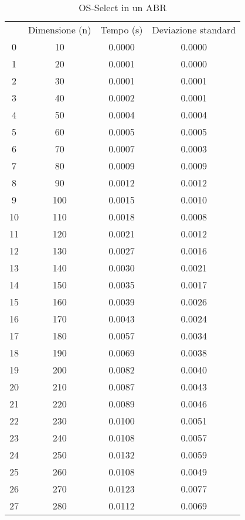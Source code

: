 \begin{table}
\centering
\caption{OS-Select in un ABR}
\label{OS-Select in un ABR}
\begin{adjustbox}{width=1\textwidth/2}
\begin{tabular}{|c|c|c|c|}
\hline
 & Dimensione (n) & Tempo (s) & Deviazione standard \\
0 & 10 & 0.0000 & 0.0000 \\
\cline{1-4}
1 & 20 & 0.0001 & 0.0000 \\
\cline{1-4}
2 & 30 & 0.0001 & 0.0001 \\
\cline{1-4}
3 & 40 & 0.0002 & 0.0001 \\
\cline{1-4}
4 & 50 & 0.0004 & 0.0004 \\
\cline{1-4}
5 & 60 & 0.0005 & 0.0005 \\
\cline{1-4}
6 & 70 & 0.0007 & 0.0003 \\
\cline{1-4}
7 & 80 & 0.0009 & 0.0009 \\
\cline{1-4}
8 & 90 & 0.0012 & 0.0012 \\
\cline{1-4}
9 & 100 & 0.0015 & 0.0010 \\
\cline{1-4}
10 & 110 & 0.0018 & 0.0008 \\
\cline{1-4}
11 & 120 & 0.0021 & 0.0012 \\
\cline{1-4}
12 & 130 & 0.0027 & 0.0016 \\
\cline{1-4}
13 & 140 & 0.0030 & 0.0021 \\
\cline{1-4}
14 & 150 & 0.0035 & 0.0017 \\
\cline{1-4}
15 & 160 & 0.0039 & 0.0026 \\
\cline{1-4}
16 & 170 & 0.0043 & 0.0024 \\
\cline{1-4}
17 & 180 & 0.0057 & 0.0034 \\
\cline{1-4}
18 & 190 & 0.0069 & 0.0038 \\
\cline{1-4}
19 & 200 & 0.0082 & 0.0040 \\
\cline{1-4}
20 & 210 & 0.0087 & 0.0043 \\
\cline{1-4}
21 & 220 & 0.0089 & 0.0046 \\
\cline{1-4}
22 & 230 & 0.0100 & 0.0051 \\
\cline{1-4}
23 & 240 & 0.0108 & 0.0057 \\
\cline{1-4}
24 & 250 & 0.0132 & 0.0059 \\
\cline{1-4}
25 & 260 & 0.0108 & 0.0049 \\
\cline{1-4}
26 & 270 & 0.0123 & 0.0077 \\
\cline{1-4}
27 & 280 & 0.0112 & 0.0069 \\

\end{tabular}
\end{adjustbox}
\end{table}
